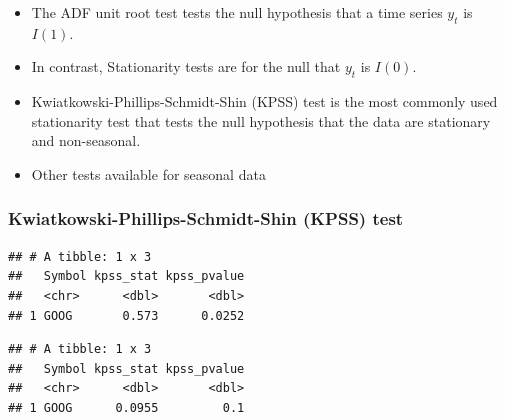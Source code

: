 \documentclass[]{book}
\newenvironment{Shaded}{\begin{snugshade}}{\end{snugshade}}
\newcommand{\DataTypeTok}[1]{\textcolor[rgb]{0.13,0.29,0.53}{#1}}
\newcommand{\DecValTok}[1]{\textcolor[rgb]{0.00,0.00,0.81}{#1}}
\newcommand{\KeywordTok}[1]{\textcolor[rgb]{0.13,0.29,0.53}{\textbf{#1}}}
\newcommand{\NormalTok}[1]{#1}
\newcommand{\OperatorTok}[1]{\textcolor[rgb]{0.81,0.36,0.00}{\textbf{#1}}}
\newcommand{\StringTok}[1]{\textcolor[rgb]{0.31,0.60,0.02}{#1}}
\providecommand{\tightlist}{%
  \setlength{\itemsep}{0pt}\setlength{\parskip}{0pt}}
\begin{document}
\begin{itemize}
\tightlist
\item
  The ADF unit root test tests the null hypothesis that a time series \(y_t\) is \(I(1)\).
\item
  In contrast, Stationarity tests are for the null that \(y_t\) is \(I(0)\).
\item
  Kwiatkowski-Phillips-Schmidt-Shin (KPSS) test is the most commonly used stationarity test that tests the null hypothesis that the data are stationary and non-seasonal.
\item
  Other tests available for seasonal data
\end{itemize}

\hypertarget{kwiatkowski-phillips-schmidt-shin-kpss-test}{%
\subsubsection{Kwiatkowski-Phillips-Schmidt-Shin (KPSS) test}\label{kwiatkowski-phillips-schmidt-shin-kpss-test}}

\begin{Shaded}
\end{Shaded}

\begin{verbatim}
## # A tibble: 1 x 3
##   Symbol kpss_stat kpss_pvalue
##   <chr>      <dbl>       <dbl>
## 1 GOOG       0.573      0.0252
\end{verbatim}

\begin{Shaded}
\end{Shaded}

\begin{verbatim}
## # A tibble: 1 x 3
##   Symbol kpss_stat kpss_pvalue
##   <chr>      <dbl>       <dbl>
## 1 GOOG      0.0955         0.1
\end{verbatim}

\begin{Shaded}
\end{Shaded}
\end{document}
